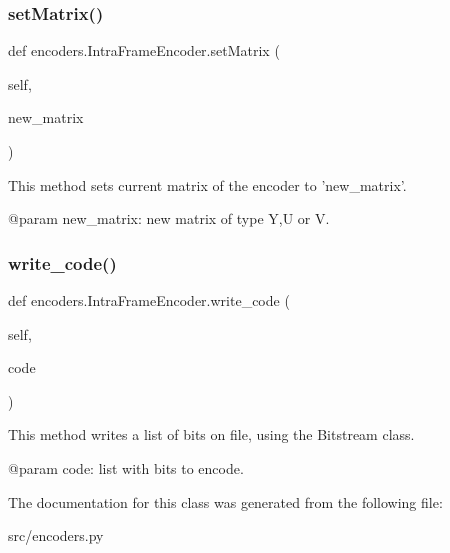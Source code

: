 \subsubsection{\texorpdfstring{set\+Matrix()}{setMatrix()}}
{\footnotesize\ttfamily def encoders.\+Intra\+Frame\+Encoder.\+set\+Matrix (\begin{DoxyParamCaption}\item[{}]{self,  }\item[{}]{new\+\_\+matrix }\end{DoxyParamCaption})}

\begin{DoxyVerb}This method sets current matrix of the encoder to 'new_matrix'.

@param new_matrix: new matrix of type Y,U or V.
\end{DoxyVerb}
 \mbox{\label{classencoders_1_1IntraFrameEncoder_a227ed9ea286d56d7f3e5ddb8ad516a3f}} 
\subsubsection{\texorpdfstring{write\+\_\+code()}{write\_code()}}
{\footnotesize\ttfamily def encoders.\+Intra\+Frame\+Encoder.\+write\+\_\+code (\begin{DoxyParamCaption}\item[{}]{self,  }\item[{}]{code }\end{DoxyParamCaption})}

\begin{DoxyVerb}This method writes a list of bits on file, using the Bitstream class.

@param code: list with bits to encode.
\end{DoxyVerb}
 

The documentation for this class was generated from the following file\+:\begin{DoxyCompactItemize}
\item 
src/encoders.\+py\end{DoxyCompactItemize}
